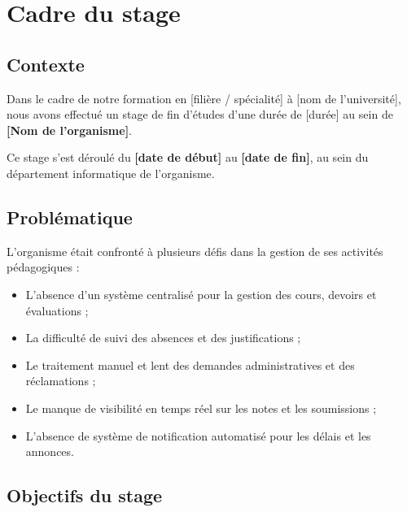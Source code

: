 \section{Cadre du stage}

\subsection*{Contexte}

Dans le cadre de notre formation en [filière / spécialité] à [nom de l'université], nous avons effectué un stage de fin d'études d'une durée de [durée] au sein de \textbf{[Nom de l'organisme]}.

\vspace{0.5cm}

Ce stage s'est déroulé du \textbf{[date de début]} au \textbf{[date de fin]}, au sein du département informatique de l'organisme.

\subsection*{Problématique}

L'organisme était confronté à plusieurs défis dans la gestion de ses activités pédagogiques :
\begin{itemize}[noitemsep]
    \item L'absence d'un système centralisé pour la gestion des cours, devoirs et évaluations ;
    \item La difficulté de suivi des absences et des justifications ;
    \item Le traitement manuel et lent des demandes administratives et des réclamations ;
    \item Le manque de visibilité en temps réel sur les notes et les soumissions ;
    \item L'absence de système de notification automatisé pour les délais et les annonces.
\end{itemize}

\subsection*{Objectifs du stage}

